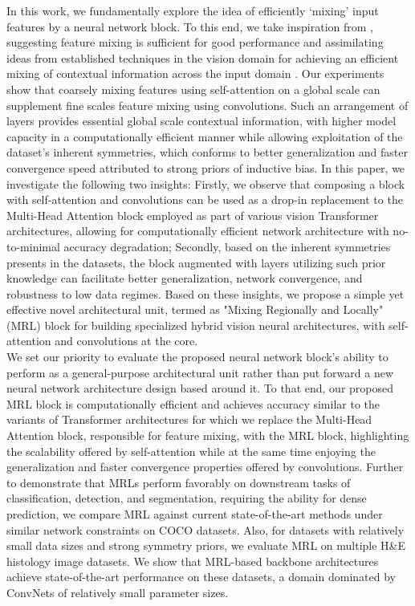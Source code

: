 \documentclass{article}
\begin{document}
    \indent In this work, we fundamentally explore the idea of efficiently `mixing' input features by a neural network block. To this end, we take inspiration from \cite{DBLP:journals/corr/MLP-Mixer, DBLP:journals/corr/FNet}, suggesting feature mixing is sufficient for good performance and assimilating ideas from established techniques in the vision domain for achieving an efficient mixing of contextual information across the input domain \cite{chen2022regionvit}. Our experiments show that coarsely mixing features using self-attention on a global scale can supplement fine scales feature mixing using convolutions. Such an arrangement of layers provides essential global scale contextual information, with higher model capacity in a computationally efficient manner while allowing exploitation of the dataset's inherent symmetries, which conforms to better generalization and faster convergence speed attributed to strong priors of inductive bias. In this paper, we investigate the following two insights: Firstly, we observe that composing a block with self-attention and convolutions can be used as a drop-in replacement to the Multi-Head Attention block employed as part of various vision Transformer architectures, allowing for computationally efficient network architecture with no-to-minimal accuracy degradation; Secondly, based on the inherent symmetries presents in the datasets, the block augmented with layers utilizing such prior knowledge can facilitate better generalization, network convergence, and robustness to low data regimes. Based on these insights, we propose a simple yet effective novel architectural unit, termed as "Mixing Regionally and Locally" (MRL) block for building specialized hybrid vision neural architectures, with self-attention and convolutions at the core. \\
    \indent We set our priority to evaluate the proposed neural network block's ability to perform as a general-purpose architectural unit rather than put forward a new neural network architecture design based around it. To that end, our proposed MRL block is computationally efficient and achieves accuracy similar to the variants of Transformer architectures for which we replace the Multi-Head Attention block, responsible for feature mixing,  with the MRL block, highlighting the scalability offered by self-attention while at the same time enjoying the generalization and faster convergence properties offered by convolutions. Further to demonstrate that MRLs perform favorably on downstream tasks of classification, detection, and segmentation, requiring the ability for dense prediction, we compare MRL against current state-of-the-art methods under similar network constraints on COCO datasets. Also, for datasets with relatively small data sizes and strong symmetry priors, we evaluate MRL on multiple H\&E histology image datasets. We show that MRL-based backbone architectures achieve state-of-the-art performance on these datasets, a domain dominated by ConvNets of relatively small parameter sizes.
\end{document}
